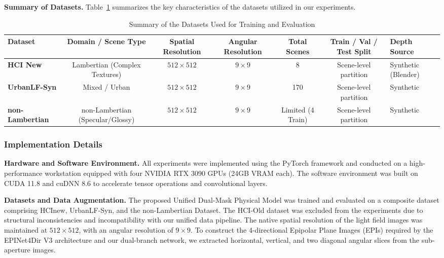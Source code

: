 \documentclass[lettersize,journal]{IEEEtran}
\begin{document}
\textbf{Summary of Datasets.} 
Table~\ref{tab:datasets} summarizes the key characteristics of the datasets utilized in our experiments.

\begin{table}[!t]
\caption{Summary of the Datasets Used for Training and Evaluation}
\label{tab:datasets}
\centering
\begin{tabular}{lcccccl}
\toprule
Dataset & Domain / Scene Type & Spatial Resolution & Angular Resolution & Total Scenes & Train / Val / Test Split & Depth Source \\
\midrule
\textbf{HCI New} & Lambertian (Complex Textures) & $512 \times 512$ & $9 \times 9$ & 8 & Scene-level partition & Synthetic (Blender) \\
\textbf{UrbanLF-Syn} & Mixed / Urban & $512 \times 512$ & $9 \times 9$ & 170 & Scene-level partition & Synthetic \\
\textbf{non-Lambertian} & non-Lambertian (Specular/Glossy) & $512 \times 512$ & $9 \times 9$ & Limited (4 Train) & Scene-level partition & Synthetic \\
\bottomrule
\end{tabular}
\end{table}

\subsubsection{Implementation Details}

\textbf{Hardware and Software Environment.} 
All experiments were implemented using the PyTorch framework \cite{5} and conducted on a high-performance workstation equipped with four NVIDIA RTX 3090 GPUs (24GB VRAM each). The software environment was built on CUDA 11.8 and cuDNN 8.6 to accelerate tensor operations and convolutional layers. 

\textbf{Datasets and Data Augmentation.} 
The proposed Unified Dual-Mask Physical Model was trained and evaluated on a composite dataset comprising HCInew, UrbanLF-Syn, and the non-Lambertian Dataset. The HCI-Old dataset was excluded from the experiments due to structural inconsistencies and incompatibility with our unified data pipeline. The native spatial resolution of the light field images was maintained at $512 \times 512$, with an angular resolution of $9 \times 9$. To construct the 4-directional Epipolar Plane Images (EPIs) required by the EPINet4Dir V3 \cite{6} architecture and our dual-branch network, we extracted horizontal, vertical, and two diagonal angular slices from the sub-aperture images. 
\end{document}
